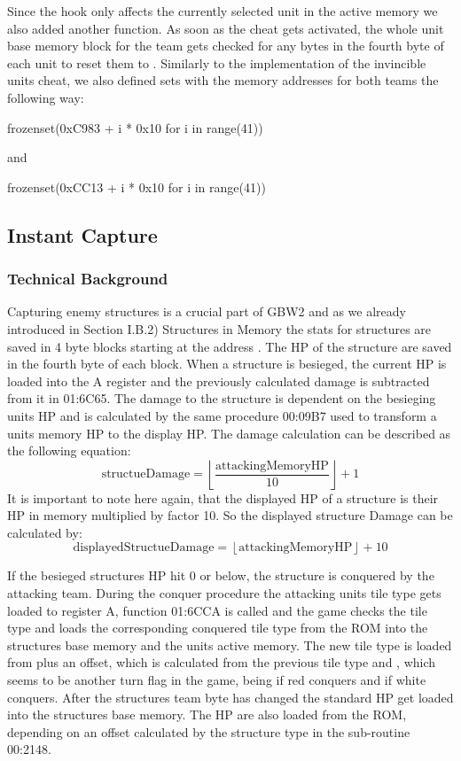 Since the hook only affects the currently selected unit in the active memory we also added another function.
As soon as the cheat gets activated, the whole unit base memory block for the team gets checked for any  bytes in the fourth byte of each unit to reset them to . Similarly to the implementation of the invincible units cheat, we also defined sets with the memory addresses for both teams the following way:

frozenset(0xC983 + i * 0x10 for i in range(41))

and

frozenset(0xCC13 + i * 0x10 for i in range(41))


\subsection{Instant Capture}
\subsubsection{Technical Background}
Capturing enemy structures is a crucial part of GBW2 and as we already introduced in Section I.B.2) Structures in Memory the stats for structures are saved in 4 byte blocks starting at the address .
The HP of the structure are saved in the fourth byte of each block. When a structure is besieged, the current HP is loaded into the A register and the previously calculated damage is subtracted from it in 01:6C65.
The damage to the structure is dependent on the besieging units HP and is calculated by the same procedure 00:09B7 used to transform a units memory HP to the display HP.
The damage calculation can be described as the following equation:
\begin{equation}
	\text{structueDamage} = \left\lfloor \frac{\text{attackingMemoryHP}}{10} \right\rfloor + 1
\end{equation}
It is important to note here again, that the displayed HP of a structure is their HP in memory multiplied by factor 10.
So the displayed structure Damage can be calculated by:
\begin{equation}
	\text{displayedStructueDamage} = \left\lfloor \text{attackingMemoryHP} \right\rfloor + 10
\end{equation}

If the besieged structures HP hit 0 or below, the structure is conquered by the attacking team.
During the conquer procedure the attacking units tile type gets loaded to register A, function 01:6CCA is called and the game checks the tile type and loads the corresponding conquered tile type from the ROM into the structures base memory and the units active memory.
The new tile type is loaded from  plus an offset, which is calculated from the previous tile type and , which seems to be another turn flag in the game, being  if red conquers and  if white conquers.
After the structures team byte has changed the standard HP get loaded into the structures base memory. The HP are also loaded from the ROM, depending on an offset calculated by the structure type in the sub-routine 00:2148.
